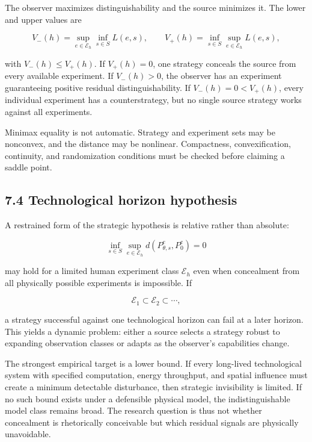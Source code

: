 \documentclass[11pt,a4paper]{article}
\begin{document}
The observer maximizes distinguishability and the source minimizes it. The lower and upper values are

\begin{equation}
V_-(h)=\sup_{e\in\mathcal E_h}\inf_{s\in S}L(e,s),
\qquad
V_+(h)=\inf_{s\in S}\sup_{e\in\mathcal E_h}L(e,s),
\end{equation}

with \(V_-(h)\le V_+(h)\). If \(V_+(h)=0\), one strategy conceals the source from every available experiment. If \(V_-(h)>0\), the observer has an experiment guaranteeing positive residual distinguishability. If \(V_-(h)=0<V_+(h)\), every individual experiment has a counterstrategy, but no single source strategy works against all experiments.

Minimax equality is not automatic. Strategy and experiment sets may be nonconvex, and the distance may be nonlinear. Compactness, convexification, continuity, and randomization conditions must be checked before claiming a saddle point.

\subsection{7.4 Technological horizon hypothesis}\label{74-technological-horizon-hypothesis}

A restrained form of the strategic hypothesis is relative rather than absolute:

\begin{equation}
\inf_{s\in S}\sup_{e\in\mathcal E_h}
d(P^e_{\theta,s},P^e_0)=0
\end{equation}

may hold for a limited human experiment class \(\mathcal E_h\) even when concealment from all physically possible experiments is impossible. If

\begin{equation}
\mathcal E_1\subset\mathcal E_2\subset\cdots,
\end{equation}

a strategy successful against one technological horizon can fail at a later horizon. This yields a dynamic problem: either a source selects a strategy robust to expanding observation classes or adapts as the observer's capabilities change.

The strongest empirical target is a lower bound. If every long-lived technological system with specified computation, energy throughput, and spatial influence must create a minimum detectable disturbance, then strategic invisibility is limited. If no such bound exists under a defensible physical model, the indistinguishable model class remains broad. The research question is thus not whether concealment is rhetorically conceivable but which residual signals are physically unavoidable.
\end{document}
